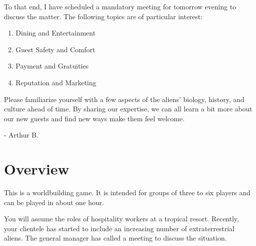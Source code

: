 \documentclass[a6paper, 11pt, parskip=half, DIV=15]{scrartcl}
\begin{document}
To that end, I have scheduled a mandatory meeting for tomorrow evening to discuss the matter.
The following topics are of particular interest:
\begin{enumerate}[nosep]
	\item Dining and Entertainment
	\item Guest Safety and Comfort
	\item Payment and Gratuities
	\item Reputation and Marketing
\end{enumerate}   

Please familiarize yourself with a few aspects of the aliens' biology, history, and culture ahead of time.
By sharing our expertise, we can all learn a bit more about our new guests and find new ways make them feel welcome.

\hspace{4.5cm}\huge\setmainfont{Caveat}- Arthur B.
\setmainfont{Quicksand}
\normalsize

\newpage
\enlargethispage{1.75\baselineskip}

\section*{Overview}
This is a worldbuilding game. It is intended for groups of three to six players and can be played in about one hour.

You will assume the roles of hospitality workers at a tropical resort. Recently, your clientele has started to include an increasing number of extraterrestrial aliens. The general manager has called a meeting to discuss the situation.

\vfill
\end{document}
